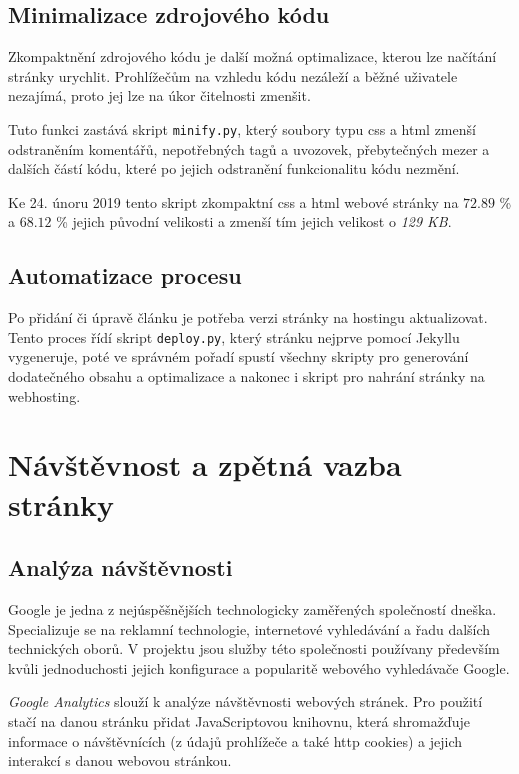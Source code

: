 \documentclass[a4paper, 12pt]{article}
\begin{document}
  \subsection{Minimalizace zdrojového kódu}
  Zkompaktnění zdrojového kódu je další možná optimalizace, kterou lze načítání stránky urychlit. Prohlížečům na vzhledu kódu nezáleží a běžné uživatele nezajímá, proto jej lze na úkor čitelnosti zmenšit.

  Tuto funkci zastává skript \texttt{minify.py}, který soubory typu \gls{css} a \gls{html} zmenší odstraněním komentářů, nepotřebných tagů a uvozovek, přebytečných mezer a dalších částí kódu, které po jejich odstranění funkcionalitu kódu nezmění.

  Ke 24. únoru 2019 tento skript zkompaktní \gls{css} a \gls{html} webové stránky na $72.89$ \% a $68.12$ \% jejich původní velikosti a zmenší tím jejich velikost o \emph{129 KB}.


  \subsection{Automatizace procesu}
  Po přidání či úpravě článku je potřeba verzi stránky na hostingu aktualizovat. Tento proces řídí skript \texttt{deploy.py}, který stránku nejprve pomocí Jekyllu vygeneruje, poté ve správném pořadí spustí všechny skripty pro generování dodatečného obsahu a optimalizace a nakonec i skript pro nahrání stránky na webhosting.


  \section{Návštěvnost a zpětná vazba stránky}

  \subsection{Analýza návštěvnosti}
  Google je jedna z nejúspěšnějších technologicky zaměřených společností dneška. Specializuje se na reklamní technologie, internetové vyhledávání a řadu dalších technických oborů. V projektu jsou služby této společnosti používany především kvůli jednoduchosti jejich konfigurace a popularitě webového vyhledávače Google.

  \emph{Google Analytics} slouží k analýze návštěvnosti webových stránek. Pro použití stačí na danou stránku přidat JavaScriptovou knihovnu, která shromažďuje informace o návštěvnících (z údajů prohlížeče a také \gls{http} cookies) a jejich interakcí s danou webovou stránkou.
\end{document}
